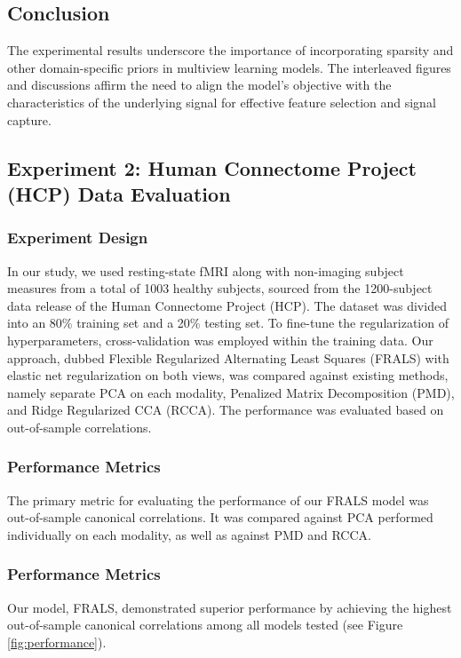 \subsection{Conclusion}

The experimental results underscore the importance of incorporating sparsity and other domain-specific priors in multiview learning models.
The interleaved figures and discussions affirm the need to align the model's objective with the characteristics of the underlying signal for effective feature selection and signal capture.




\subsection{Experiment 2: Human Connectome Project (HCP) Data Evaluation}

\subsubsection{Experiment Design}
In our study, we used resting-state fMRI along with non-imaging subject measures from a total of 1003 healthy subjects, sourced from the 1200-subject data release of the Human Connectome Project (HCP). The dataset was divided into an 80\% training set and a 20\% testing set.
To fine-tune the regularization of hyperparameters, cross-validation was employed within the training data.
Our approach, dubbed Flexible Regularized Alternating Least Squares (FRALS) with elastic net regularization on both views, was compared against existing methods, namely separate PCA on each modality, Penalized Matrix Decomposition (PMD), and Ridge Regularized CCA (RCCA). The performance was evaluated based on out-of-sample correlations.

\subsubsection{Performance Metrics}
The primary metric for evaluating the performance of our FRALS model was out-of-sample canonical correlations.
It was compared against PCA performed individually on each modality, as well as against PMD and RCCA\@.

\subsubsection{Performance Metrics}
Our model, FRALS, demonstrated superior performance by achieving the highest out-of-sample canonical correlations among all models tested (see Figure \ref{fig:performance}).

